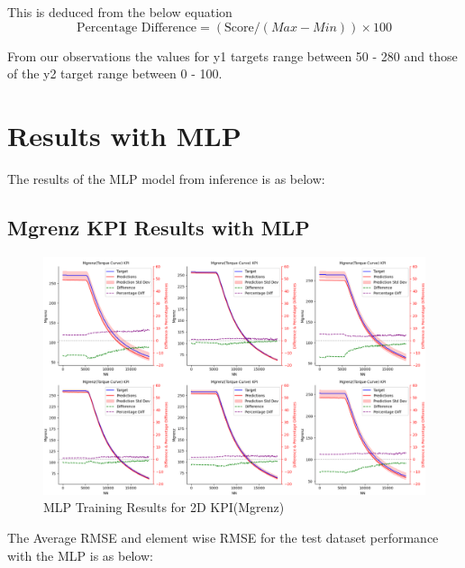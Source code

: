 \documentclass{report} %
\begin{document}
This is deduced from the below equation
\begin{equation}
    \text{Percentage Difference} = (\text{Score} / {(Max - Min)})  \times 100
    \label{eq:Percentage Difference}
\end{equation}

From our observations the values for y1 targets range between 50 - 280 and those of the y2 target range between 0 - 100.

\section{Results with \ac{MLP}}\label{sec:Results with MLP}

The results of the \ac{MLP} model from inference is as below: \\

\subsection{Mgrenz \ac{KPI} Results with \ac{MLP}}\label{sec:2D Torque Curve Results with MLP}

\begin{figure}[H]
    \centering
    \includegraphics[width=1\textwidth]{./ReportImages/KPI2D_predictions.png} 
    \caption{MLP Training Results for 2D KPI(Mgrenz)} 
    \label{fig:MLP Training Results for 2D KPI(Mgrenz)}
\end{figure}

The Average \ac{RMSE} and element wise \ac{RMSE} for the test dataset performance with the \ac{MLP} is as below: \\
\end{document}
